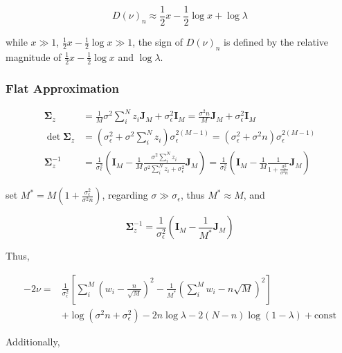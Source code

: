 \begin{equation}
    D(\nu)_n \approx \frac{1}{2}x - \frac{1}{2}\log x + \log\lambda
\end{equation}

while $x \gg 1$, $\frac{1}{2}x - \frac{1}{2}\log x \gg 1$, the sign of $D(\nu)_n$ is defined by the relative magnitude of $\frac{1}{2}x - \frac{1}{2}\log x$ and $\log\lambda$. 

\subsubsection{Flat Approximation}

\begin{equation}
\begin{aligned}
    \bm{\Sigma}_z &= \frac{1}{M}\sigma^2\sum_i^N z_i\bm{J}_M + \sigma_\epsilon^2\bm{I}_M = \frac{\sigma^2n}{M}\bm{J}_M+\sigma_\epsilon^2\bm{I}_M \\
    \det\bm{\Sigma}_z &= (\sigma_\epsilon^2 + \sigma^2\sum_i^N z_i)\sigma_\epsilon^{2(M-1)} = (\sigma_\epsilon^2 + \sigma^2n)\sigma_\epsilon^{2(M-1)} \\
    \bm{\Sigma}_z^{-1} &= \frac{1}{\sigma_\epsilon^2}(\bm{I}_M - \frac{1}{M}\frac{\sigma^2\sum_i^N z_i}{\sigma^2\sum_i^N z_i+\sigma_\epsilon^2}\bm{J}_M) = \frac{1}{\sigma_\epsilon^2}(\bm{I}_M - \frac{1}{M}\frac{1}{1+\frac{\sigma_\epsilon^2}{\sigma^2n}}\bm{J}_M)
\end{aligned}
\end{equation}

set $M^\ast = M(1+\frac{\sigma_\epsilon^2}{\sigma^2n})$, regarding $\sigma\gg\sigma_\epsilon$, thus $M^\ast\approx M$, and

\begin{equation}
    \bm{\Sigma}_z^{-1} = \frac{1}{\sigma_\epsilon^2}(\bm{I}_M - \frac{1}{M^\ast}\bm{J}_M)
\end{equation}

Thus, 

\begin{equation}
\begin{aligned}
    -2\nu =& \frac{1}{\sigma_\epsilon^2}[\sum_i^M(w_i-\frac{n}{\sqrt{M}})^2-\frac{1}{M^\ast}(\sum_i^M w_i-n\sqrt{M})^2] \\
    &+ \log(\sigma^2n+\sigma_\epsilon^2) - 2n\log\lambda - 2(N-n)\log(1-\lambda) + \mathrm{const}
\end{aligned}
\end{equation}

Additionally, 

